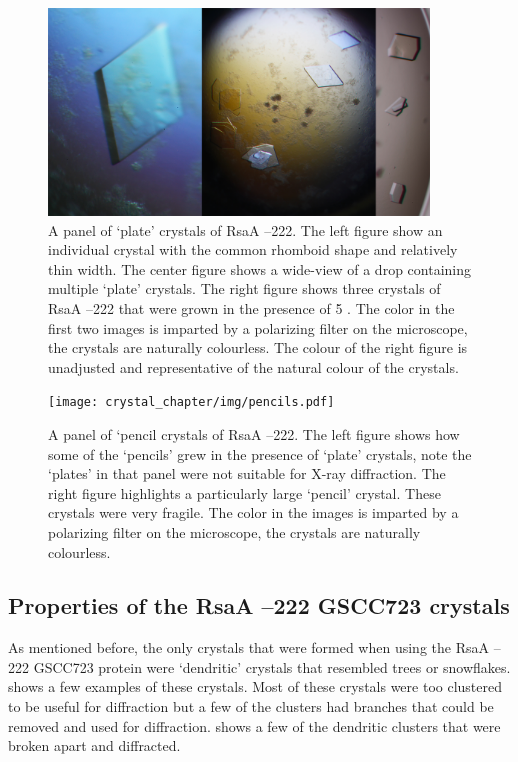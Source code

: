\begin{figure}[htb]
  	\begin{center}
   		\includegraphics[width=0.9\textwidth]{crystal_chapter/img/goodxtal.jpg}
   	\end{center}
   	\caption[Panel of well diffracting `plate' crystals of RsaA --222]{A panel of `plate' crystals of RsaA --222. The left figure show an individual crystal with the common rhomboid shape and relatively thin width. The center figure shows a wide-view of a drop containing multiple `plate' crystals. The right figure shows three crystals of RsaA --222 that were grown in the presence of 5 \millimolar{} . The color in the first two images is imparted by a polarizing filter on the microscope, the crystals are naturally colourless. The colour of the right figure is unadjusted and representative of the natural colour of the crystals.}
   	\label{fig:crystal-panel}
\end{figure}   
\begin{figure}[htb]
  	\begin{center}
   		\texttt{[image: crystal\_chapter/img/pencils.pdf]}
   	\end{center}
   	\caption[A panel of `pencil crystals of RsaA --222']{A panel of `pencil crystals of RsaA --222. The left figure shows how some of the `pencils' grew in the presence of `plate' crystals, note the `plates' in that panel were not suitable for X-ray diffraction. The right figure highlights a particularly large `pencil' crystal. These crystals were very fragile.  The color in the images is imparted by a polarizing filter on the microscope, the crystals are naturally colourless.} 
   	\label{fig:pencils}
\end{figure}   

\subsection{Properties of the RsaA --222 GSCC723 crystals}\label{sec:properties-rsaa-del}
As mentioned before, the only crystals that were formed when using the RsaA --222 GSCC723 protein were `dendritic' crystals that resembled trees or snowflakes.  shows a few examples of these crystals. Most of these crystals were too clustered to be useful for diffraction but a few of the clusters had branches that could be removed and used for diffraction.  shows a few of the dendritic clusters that were broken apart and diffracted. 

